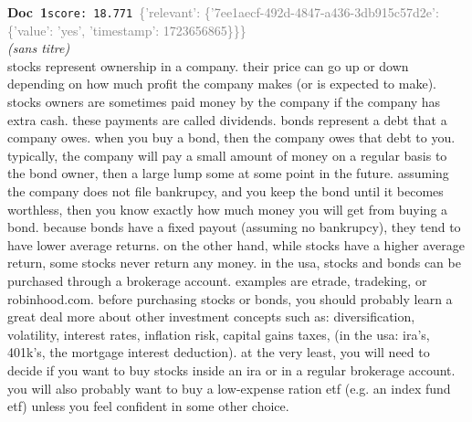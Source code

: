 \documentclass[a4paper,11pt]{article}
\begin{document}
\begin{docenv}
{\footnotesize\textcolor{doccolor}{\textbf{Doc~1}}}\hfill{\tiny\texttt{score:~18.771}}\ {\tiny\textcolor{gray}{\{'relevant': \{'7ee1aecf-492d-4847-a436-3db915c57d2e': \{'value': 'yes', 'timestamp': 1723656865\}\}\}}}\\[3pt]
{\small\textit{(sans titre)}}\\[2pt]
\vspace{2pt}
{\footnotesize 
stocks represent ownership in a company. their price can go up or down depending on how much profit the company makes (or is expected to make).  stocks owners are sometimes paid money by the company if the company has extra cash.  these payments are called dividends. bonds represent a debt that a company owes.  when you buy a bond, then the company owes that debt to you.  typically, the company will pay a small amount of money on a regular basis to the bond owner, then a large lump some at some point in the future. assuming the company does not file bankrupcy, and you keep the bond until it becomes worthless, then you know exactly how much money you will get from buying a bond. because bonds have a fixed payout (assuming no bankrupcy), they tend to have lower average returns.  on the other hand, while stocks have a higher average return, some stocks never return any money. in the usa, stocks and bonds can be purchased through a brokerage account. examples are etrade, tradeking, or robinhood.com.   before purchasing stocks or bonds, you should probably learn a great deal more about other investment concepts such as: diversification, volatility, interest rates, inflation risk, capital gains taxes, (in the usa: ira's, 401k's, the mortgage interest deduction).  at the very least, you will need to decide if you want to buy stocks inside an ira or in a regular brokerage account. you will also probably want to buy a low-expense ration etf (e.g. an index fund etf) unless you feel confident in some other choice.}
\end{docenv}
\end{document}
